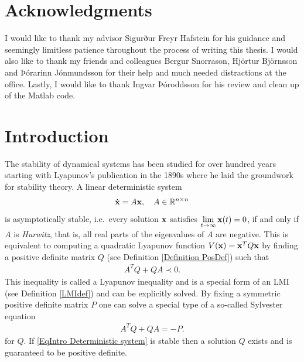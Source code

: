 \documentclass[a4paper,12pt,twoside,BCOR=10mm]{scrbook}
\begin{document}

\chapter*{Acknowledgments}
I would like to thank my advisor Sigurður Freyr Hafstein for his guidance and seemingly limitless patience throughout the process of writing this thesis. I would also like to thank my friends and colleagues Bergur Snorrason, Hjörtur Björnsson and Þórarinn Jónmundsson for their help and much needed distractions at the office. Lastly, I would like to thank Ingvar Þóroddsson for his review and clean up of the Matlab code.

\chapter{Introduction}
\setcounter{page}{1}

The stability of dynamical systems has been studied for over hundred years starting with Lyapunov's publication in the 1890s where he laid the groundwork for stability theory. A linear deterministic system
\begin{align}\label{EqIntro Deterministic system}
    \Dot{\mathbf{x}} = A\mathbf{x},\quad A \in \mathbb{R}^{n\times n}
\end{align}
is asymptotically stable, i.e.~every solution $\mathbf{x}$ satisfies $\lim\limits_{t\to\infty} \mathbf{x}(t) = 0$, if and only if $A$ is \textit{Hurwitz}, that is, all real parts of the eigenvalues of $A$ are negative. This is equivalent to computing a quadratic Lyapunov function $V(\mathbf{x}) = \mathbf{x}^T Q \mathbf{x}$ by finding a positive definite matrix $Q$ (see Definition \ref{Definition PosDef}) such that
\begin{align*}
    A^TQ + QA \prec 0.
\end{align*}
This inequality is called a Lyapunov inequality and is a special form of an LMI (see Definition \ref{LMIdef}) and can be explicitly solved. By fixing a symmetric positive definite matrix $P$ one can solve a special type of a so-called Sylvester equation \citep{sylvester1884}
\begin{align*}
    A^TQ + QA = -P.
\end{align*}
for $Q$. If \eqref{EqIntro Deterministic system} is stable then a solution $Q$ exists and is guaranteed to be positive definite.
\end{document}
